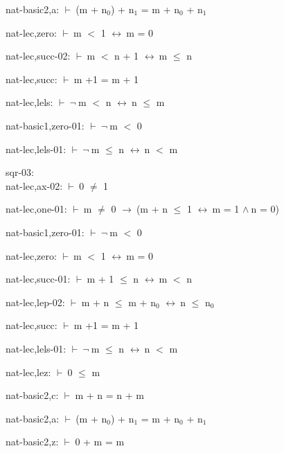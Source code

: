 \documentclass[a4paper]{article}
\newcommand{\Fol}{\mbox{$\vdash\ $}}
\newcommand{\Not}{\mbox{$\neg\ $}}
\newcommand{\And}{\mbox{$\wedge\ $}}
\newcommand{\Imp}{\mbox{$\rightarrow\ $}}
\newcommand{\Equiv}{\mbox{$\leftrightarrow\ $}}
\begin{document}
nat-basic2,a: 
 \Fol (m + $\mbox{n}_{0}$) + $\mbox{n}_{1}$ = m + $\mbox{n}_{0}$ + $\mbox{n}_{1}$



nat-lec,zero: 
 \Fol m $<$ 1 \Equiv m = 0



nat-lec,succ-02: 
 \Fol m $<$ n + 1 \Equiv m $\le$ n



nat-lec,succ: 
 \Fol m +1 = m + 1



nat-lec,lels: 
 \Fol \Not m $<$ n \Equiv n $\le$ m



nat-basic1,zero-01: 
 \Fol \Not m $<$ 0



nat-lec,lels-01: 
 \Fol \Not m $\le$ n \Equiv n $<$ m



\bigskip

sqr-03:\\ nat-lec,ax-02: 
 \Fol 0 $\neq$ 1



nat-lec,one-01: 
 \Fol m $\neq$ 0 \Imp (m + n $\le$ 1 \Equiv m = 1 \And n = 0)



nat-basic1,zero-01: 
 \Fol \Not m $<$ 0



nat-lec,zero: 
 \Fol m $<$ 1 \Equiv m = 0



nat-lec,succ-01: 
 \Fol m + 1 $\le$ n \Equiv m $<$ n



nat-lec,lep-02: 
 \Fol m + n $\le$ m + $\mbox{n}_{0}$ \Equiv n $\le$ $\mbox{n}_{0}$



nat-lec,succ: 
 \Fol m +1 = m + 1



nat-lec,lels-01: 
 \Fol \Not m $\le$ n \Equiv n $<$ m



nat-lec,lez: 
 \Fol 0 $\le$ m



nat-basic2,c: 
 \Fol m + n = n + m



nat-basic2,a: 
 \Fol (m + $\mbox{n}_{0}$) + $\mbox{n}_{1}$ = m + $\mbox{n}_{0}$ + $\mbox{n}_{1}$



nat-basic2,z: 
 \Fol 0 + m = m
\end{document}
